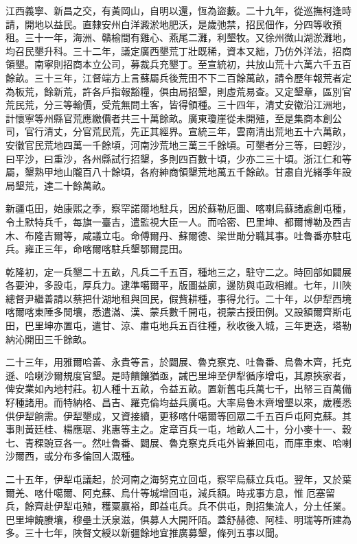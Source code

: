 \begin{pinyinscope}
江西義寧、新昌之交，有黃岡山，自明以還，恆為盜藪。二十九年，從巡撫柯逢時請，開地以益民。直隸安州白洋澱淤地肥沃，是歲弛禁，招民佃作，分四等收預租。三十一年，海洲、贛榆間有雞心、燕尾二灘，利墾牧。又徐州微山湖淤灘地，均召民墾升科。三十二年，議定廣西墾荒丁壯既稀，資本又絀，乃仿外洋法，招商領墾。南寧則招商本立公司，募裁兵充墾丁。至宣統初，共放山荒十六萬六千五百餘畝。三十三年，江督端方上言蘇屬兵後荒田不下二百餘萬畝，請令歷年報荒者定為板荒，餘新荒，許各戶指報豁糧，俱由局招墾，則虛荒易查。又定墾章，區別官荒民荒，分三等輸價，受荒無問土客，皆得領種。三十四年，清丈安徽沿江洲地，計懷寧等州縣官荒應繳價者共三十萬餘畝。廣東瓊崖從未開殖，至是集商本創公司，官行清丈，分官荒民荒，先正其經界。宣統三年，雲南清出荒地五十六萬畝，安徽官民荒地四萬一千餘頃，河南沙荒地三萬三千餘頃。可墾者分三等，曰輕沙，曰平沙，曰重沙，各州縣試行招墾，多則四百數十頃，少亦二三十頃。浙江仁和等屬，墾熟甲地山隴百八十餘頃，各府紳商領墾荒地萬五千餘畝。甘肅自光緒季年設局墾荒，達二十餘萬畝。

新疆屯田，始康熙之季，察罕諾爾地駐兵，因於蘇勒厄圖、喀喇烏蘇諸處創屯種，令土默特兵千，每旗一臺吉，遣監視大臣一人。而哈密、巴里坤、都爾博勒及西吉木、布隆吉爾等，咸議立屯。命傅爾丹、蘇爾德、梁世勛分職其事。吐魯番亦駐屯兵。雍正三年，命喀爾喀駐兵墾鄂爾昆田。

乾隆初，定一兵墾二十五畝，凡兵二千五百，種地三之，駐守二之。時回部如闢展各要沖，多設屯，厚兵力。逮準噶爾平，版圖益廓，邊防與屯政相維。七年，川陜總督尹繼善請以蔡把什湖地租與回民，假貲耕種，事得允行。二十年，以伊犁西境喀爾喀東陲多閒壤，悉遣滿、漢、蒙兵數千開屯，視蒙古授田例。又設額爾齊斯屯田，巴里坤亦置屯，遣甘、涼、肅屯地兵五百往種，秋收後入城，三年更迭，塔勒納沁開田三千餘畝。

二十三年，用雅爾哈善、永貴等言，於闢展、魯克察克、吐魯番、烏魯木齊，托克遜、哈喇沙爾規度官墾。是時饋饟猶亟，誡巴里坤至伊犁循序增屯，其原挾家者，俾安業如內地村莊。初人種十五畝，令益五畝。置新舊屯兵萬七千，出帑三百萬備籽種諸用。而特納格、昌吉、羅克倫均益兵廣屯。大率烏魯木齊增墾以來，歲穫悉供伊犁餉需。伊犁墾成，又資接續，更移喀什噶爾等回眾二千五百戶屯阿克蘇。其事則黃廷桂、楊應琚、兆惠等主之。定章百兵一屯，地畝人二十，分小麥十一、穀七、青稞豌豆各一。然吐魯番、闢展、魯克察克兵屯外皆兼回屯，而庫車東、哈喇沙爾西，或分布多倫回人溉種。

二十五年，伊犁屯議起，於河南之海努克立回屯，察罕烏蘇立兵屯。翌年，又於葉爾羌、喀什噶爾、阿克蘇、烏什等城增回屯，減兵額。時戎事方息，惟厄塞留兵，餘齊赴伊犁屯殖，穫粟贏裕，即益屯兵。兵不供屯，則招集流人，分土任業。巴里坤饒賸壤，穆壘土沃泉滋，俱募人大開阡陌。蓋舒赫德、阿桂、明瑞等所建為多。三十七年，陜督文綬以新疆餘地宜推廣募墾，條列五事以聞。


\end{pinyinscope}
